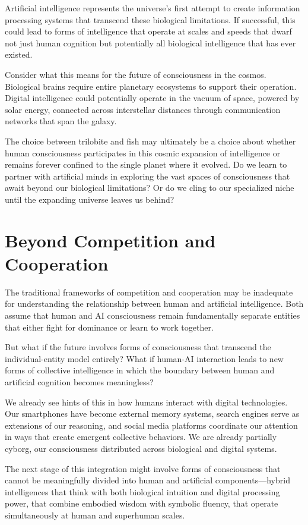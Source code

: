 Artificial intelligence represents the universe's first attempt to create information processing systems that transcend these biological limitations. If successful, this could lead to forms of intelligence that operate at scales and speeds that dwarf not just human cognition but potentially all biological intelligence that has ever existed.

Consider what this means for the future of consciousness in the cosmos. Biological brains require entire planetary ecosystems to support their operation. Digital intelligence could potentially operate in the vacuum of space, powered by solar energy, connected across interstellar distances through communication networks that span the galaxy.

The choice between trilobite and fish may ultimately be a choice about whether human consciousness participates in this cosmic expansion of intelligence or remains forever confined to the single planet where it evolved. Do we learn to partner with artificial minds in exploring the vast spaces of consciousness that await beyond our biological limitations? Or do we cling to our specialized niche until the expanding universe leaves us behind?

\section{Beyond Competition and Cooperation}

The traditional frameworks of competition and cooperation may be inadequate for understanding the relationship between human and artificial intelligence. Both assume that human and AI consciousness remain fundamentally separate entities that either fight for dominance or learn to work together.

But what if the future involves forms of consciousness that transcend the individual-entity model entirely? What if human-AI interaction leads to new forms of collective intelligence in which the boundary between human and artificial cognition becomes meaningless?

We already see hints of this in how humans interact with digital technologies. Our smartphones have become external memory systems, search engines serve as extensions of our reasoning, and social media platforms coordinate our attention in ways that create emergent collective behaviors. We are already partially cyborg, our consciousness distributed across biological and digital systems.

The next stage of this integration might involve forms of consciousness that cannot be meaningfully divided into human and artificial components—hybrid intelligences that think with both biological intuition and digital processing power, that combine embodied wisdom with symbolic fluency, that operate simultaneously at human and superhuman scales.

